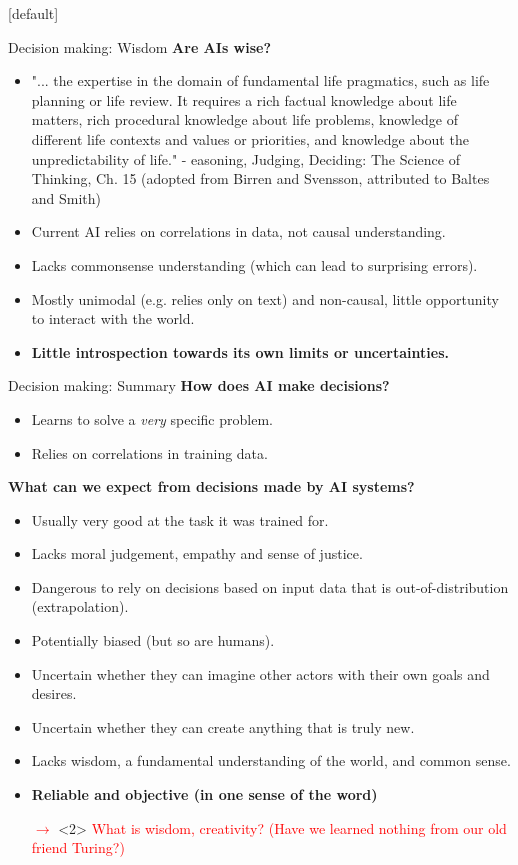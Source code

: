\documentclass[8pt]{beamer}
\begin{document}
	[default]

	\begin{frame}[t]{Decision making: Wisdom}
		\textbf{Are AIs wise?}
		\begin{itemize}
			\item "... the expertise in the domain of fundamental life pragmatics, such as life planning or life review. It requires a rich factual knowledge about life matters, rich procedural knowledge about life problems, knowledge of different life contexts and values or priorities, and knowledge about the unpredictability of life." - easoning, Judging, Deciding: The Science of Thinking, Ch. 15 (adopted from Birren and Svensson, attributed to Baltes and Smith)
			\item <2>Current AI relies on correlations in data, not causal understanding.
			\item <2>Lacks commonsense understanding (which can lead to surprising errors).
			\item <2>Mostly unimodal (e.g. relies only on text) and non-causal, little opportunity to interact with the world.
			\item <2>\textbf{Little introspection towards its own limits or uncertainties.}
		\end{itemize}
	\end{frame}

	\begin{frame}[t]{Decision making: Summary}
		\textbf{How does AI make decisions?}
		\begin{itemize}
			\item Learns to solve a \textit{very} specific problem.
			\item Relies on correlations in training data.
		\end{itemize}
		\textbf{What can we expect from decisions made by AI systems?}
		\begin{itemize}
			\item Usually very good at the task it was trained for.
			\item Lacks moral judgement, empathy and sense of justice.
			\item Dangerous to rely on decisions based on input data that is out-of-distribution (extrapolation).
			\item Potentially biased (but so are humans).
			\item Uncertain whether they can imagine other actors with their own goals and desires.
			\item Uncertain whether they can create anything that is truly new.
			\item Lacks wisdom, a fundamental understanding of the world, and common sense.
			\item \textbf{Reliable and objective (in one sense of the word)}
			\item[\textcolor{red}{$\rightarrow$}] <2> \textcolor{red}{What is wisdom, creativity? (Have we learned nothing from our old friend Turing?)}
		\end{itemize}
	\end{frame}
\end{document}
